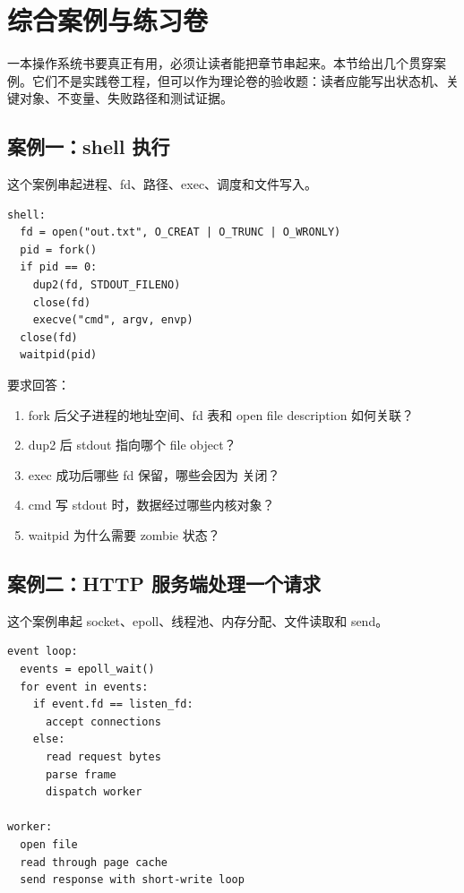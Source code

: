 \section{综合案例与练习卷}

一本操作系统书要真正有用，必须让读者能把章节串起来。本节给出几个贯穿案例。它们不是实践卷工程，但可以作为理论卷的验收题：读者应能写出状态机、关键对象、不变量、失败路径和测试证据。

\subsection{案例一：shell 执行 }

这个案例串起进程、fd、路径、exec、调度和文件写入。

\begin{lstlisting}
shell:
  fd = open("out.txt", O_CREAT | O_TRUNC | O_WRONLY)
  pid = fork()
  if pid == 0:
    dup2(fd, STDOUT_FILENO)
    close(fd)
    execve("cmd", argv, envp)
  close(fd)
  waitpid(pid)
\end{lstlisting}

要求回答：

\begin{enumerate}
\tightlist
\item fork 后父子进程的地址空间、fd 表和 open file description 如何关联？
\item dup2 后 stdout 指向哪个 file object？
\item exec 成功后哪些 fd 保留，哪些会因为  关闭？
\item cmd 写 stdout 时，数据经过哪些内核对象？
\item waitpid 为什么需要 zombie 状态？
\end{enumerate}

\subsection{案例二：HTTP 服务端处理一个请求}

这个案例串起 socket、epoll、线程池、内存分配、文件读取和 send。

\begin{lstlisting}
event loop:
  events = epoll_wait()
  for event in events:
    if event.fd == listen_fd:
      accept connections
    else:
      read request bytes
      parse frame
      dispatch worker

worker:
  open file
  read through page cache
  send response with short-write loop
\end{lstlisting}

